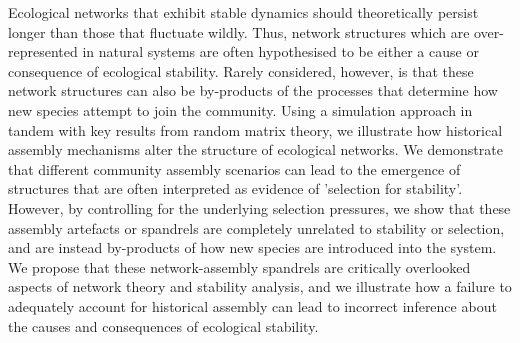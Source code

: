 \documentclass[11pt]{article}
\begin{document}
	Ecological networks that exhibit stable dynamics should theoretically persist longer than those that fluctuate wildly. Thus, network structures which are over-represented in natural systems are often hypothesised to be either a cause or consequence of ecological stability. Rarely considered, however, is that these network structures can also be by-products of the processes that determine how new species attempt to join the community. Using a simulation approach in tandem with key results from random matrix theory, we illustrate how historical assembly mechanisms alter the structure of ecological networks. We demonstrate that different community assembly scenarios can lead to the emergence of structures that are often interpreted as evidence of 'selection for stability'. However, by controlling for the underlying selection pressures, we show that these assembly artefacts or spandrels are completely unrelated to stability or selection, and are instead by-products of how new species are introduced into the system. We propose that these network-assembly spandrels are critically overlooked aspects of network theory and stability analysis, and we illustrate how a failure to adequately account for historical assembly can lead to incorrect inference about the causes and consequences of ecological stability.
	
\end{document}
